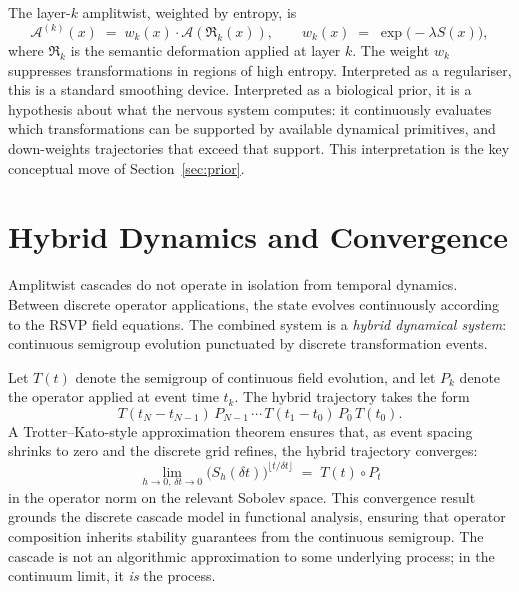 \documentclass[12pt, a4paper]{article}
\theoremstyle{remark}
\theoremstyle{definition}
\newcommand{\A}{\mathcal{A}}
\newcommand{\Rk}{\mathfrak{R}}
\begin{document}
The layer-$k$ amplitwist, weighted by entropy, is
\begin{equation}
  \A^{(k)}(x) \;=\; w_k(x)\cdot \A\!\left(\Rk_k(x)\right), \qquad
  w_k(x) \;=\; \exp\!\bigl(-\lambda S(x)\bigr),
  \label{eq:weighted}
\end{equation}
where $\Rk_k$ is the semantic deformation applied at layer $k$.  The weight $w_k$
suppresses transformations in regions of high entropy.  Interpreted as a regulariser, this
is a standard smoothing device.  Interpreted as a biological prior, it is a hypothesis
about what the nervous system computes: it continuously evaluates which transformations can
be supported by available dynamical primitives, and down-weights trajectories that exceed
that support.  This interpretation is the key conceptual move of Section~\ref{sec:prior}.

\section{Hybrid Dynamics and Convergence}
\label{sec:hybrid}

Amplitwist cascades do not operate in isolation from temporal dynamics.  Between discrete
operator applications, the state evolves continuously according to the RSVP field
equations.  The combined system is a \emph{hybrid dynamical system}: continuous semigroup
evolution punctuated by discrete transformation events.

Let $T(t)$ denote the semigroup of continuous field evolution, and let $P_k$ denote the
operator applied at event time $t_k$.  The hybrid trajectory takes the form
\begin{equation}
  T(t_N - t_{N-1})\, P_{N-1}\, \cdots\, T(t_1 - t_0)\, P_0\, T(t_0).
  \label{eq:hybrid}
\end{equation}
A Trotter--Kato-style approximation theorem ensures that, as event spacing shrinks to zero
and the discrete grid refines, the hybrid trajectory converges:
\begin{equation}
  \lim_{h \to 0,\, \delta t \to 0}
  \bigl(S_h(\delta t)\bigr)^{\lfloor t/\delta t\rfloor}
  \;=\; T(t) \circ P_t
  \label{eq:trotterkato}
\end{equation}
in the operator norm on the relevant Sobolev space.  This convergence result grounds the
discrete cascade model in functional analysis, ensuring that operator composition inherits
stability guarantees from the continuous semigroup.  The cascade is not an algorithmic
approximation to some underlying process; in the continuum limit, it \emph{is} the process.
\end{document}
